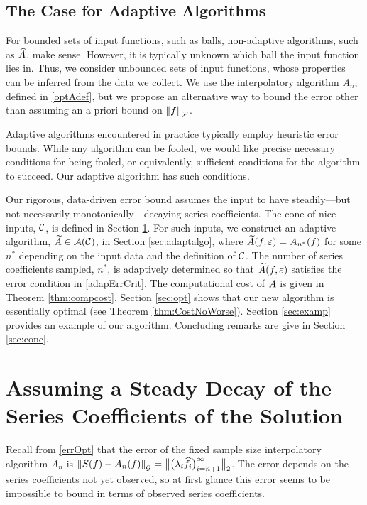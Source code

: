 \documentclass[final]{elsarticle}
\theoremstyle{definition}
\theoremstyle{remark}
\newcommand{\optAn}{A_n}
\begin{document}
\subsection{The Case for Adaptive Algorithms}
For bounded sets of input functions, such as balls, non-adaptive algorithms, such as $\hA$, make sense.  However, it is typically unknown which ball the input function lies in.  Thus, we consider unbounded sets of input functions, whose properties can be inferred from the data we collect.  We use the interpolatory algorithm $\optAn$, defined in \eqref{optAdef}, but we propose an alternative way to bound the error other than assuming an a priori bound on $\norm[\cf]{f}$.

Adaptive algorithms encountered in practice typically employ heuristic error bounds.  While any algorithm can be fooled, we would like precise necessary conditions for being fooled, or equivalently, sufficient conditions for the algorithm to succeed.  Our adaptive algorithm has such conditions.

Our rigorous, data-driven error bound assumes the input to have steadily---but not necessarily monotonically---decaying series coefficients.  The cone of nice inputs, $\cc$, is defined in Section \ref{sec:cone}.  For such inputs, we construct an adaptive algorithm, $\tA \in \ca(\cc)$, in Section \ref{sec:adaptalgo},  where $\tA(f,\varepsilon) = A_{n^*}(f)$ for some $n^*$ depending on the input data and the definition of $\cc$.  The number of series coefficients sampled, $n^*$, is adaptively determined so that $\tA(f,\varepsilon)$ satisfies the error condition in \eqref{adapErrCrit}.  The computational cost of $\tA$ is given in  Theorem \ref{thm:compcost}.  Section \ref{sec:opt} shows that our new algorithm is essentially optimal (see Theorem \ref{thm:CostNoWorse}).  Section \ref{sec:examp} provides an example of our algorithm.  Concluding remarks are give in Section \ref{sec:conc}. 




\section{Assuming a Steady Decay of the Series Coefficients of the Solution} \label{sec:cone}

Recall from \eqref{errOpt} that the error of the fixed sample size interpolatory algorithm $\optAn$ is $\norm[\cg]{S(f) - \optAn(f)} = \bignorm[2]{\bigl(\lambda_{i} \hf_{i} \bigr)_{i= n+1}^{\infty}}$.  The error depends on the series coefficients not yet observed, so at first glance this error seems to be impossible to bound in terms of observed series coefficients.  
\end{document}
